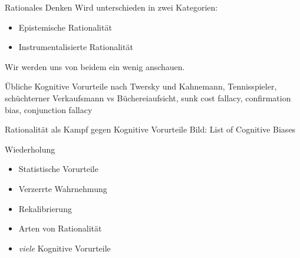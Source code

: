 \begin{frame}[c]{Rationales Denken}
    \pause
    Wird unterschieden in zwei Kategorien: \newline
    \pause
    \begin{itemize}
        \item Epistemische Rationalität \pause
        \item Instrumentalisierte Rationalität
        \newline
    \end{itemize}
    \pause
    Wir werden uns von beidem ein wenig anschauen.
\end{frame}


\begin{frame}[c]{Übliche Kognitive Vorurteile}
    nach Twersky und Kahnemann, Tennisspieler, schüchterner Verkaufsmann vs Büchereiaufsicht, sunk cost fallacy, confirmation bias, conjunction fallacy
\end{frame}


\begin{frame}[c]{Rationalität als Kampf gegen Kognitive Vorurteile}
    Bild: List of Cognitive Biases
\end{frame}


\begin{frame}[c]{Wiederholung}
    \begin{itemize}
        \pause
        \item Statistische Vorurteile
        \pause
        \item Verzerrte Wahrnehmung
        \pause
        \item Rekalibrierung
        \pause
        \item Arten von Rationalität
        \pause
        \item {\em viele} Kognitive Vorurteile
    \end{itemize}
\end{frame}


\fi

